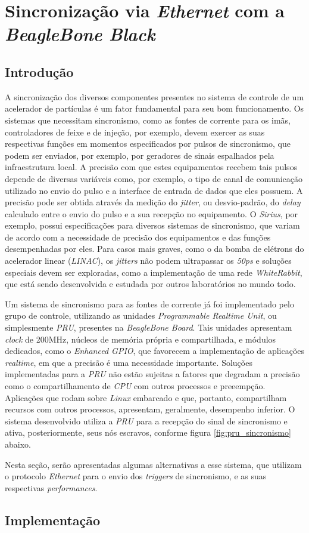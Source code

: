 \section {Sincronização via \textit{Ethernet} com a \textit{BeagleBone Black}}

\subsection {Introdução}

A sincronização dos diversos componentes presentes no sistema de controle de um
acelerador de partículas é um fator fundamental para seu bom funcionamento. Os
sistemas que necessitam sincronismo, como as fontes de corrente para os imãs,
controladores de feixe e de injeção, por exemplo, devem exercer as suas
respectivas funções em momentos especificados por pulsos de sincronismo, que
podem ser enviados, por exemplo, por geradores de sinais espalhados pela
infraestrutura local. A precisão com que estes equipamentos recebem tais pulsos
depende de diversas variáveis como, por exemplo, o tipo de canal de comunicação
utilizado no envio do pulso e a interface de entrada de dados que eles possuem.
A precisão pode ser obtida através da medição do \textit{jitter}, ou
desvio-padrão, do \textit{delay} calculado entre o envio do pulso e a sua
recepção no equipamento.
O \textit{Sirius}, por exemplo, possui especificações para diversos sistemas de
sincronismo, que variam de acordo com a necessidade de precisão dos equipamentos
e das funções desempenhadas por eles. Para casos mais graves, como o da bomba de
elétrons do acelerador linear (\textit{LINAC}), os \textit{jitters} não podem
ultrapassar os \textit{50ps} e soluções especiais devem ser exploradas, como a
implementação de uma rede \textit{WhiteRabbit}, que está sendo
desenvolvida e estudada por outros laboratórios no mundo todo.

\vspace{12pt}

Um sistema de sincronismo para as fontes de corrente já
foi implementado pelo grupo de controle, utilizando as unidades
\textit{Programmable Realtime Unit}, ou simplesmente \textit{PRU}, presentes na
\textit{BeagleBone Board}. Tais unidades apresentam \textit{clock} de 200MHz,
núcleos de memória própria e compartilhada, e módulos dedicados, como o
\textit{Enhanced GPIO}, que favorecem a implementação de aplicações
\textit{realtime}, em que a precisão é uma necessidade importante. Soluções
implementadas para a \textit{PRU} não estão sujeitas a fatores que degradam a
precisão como o compartilhamento de \textit{CPU} com outros
processos e preeempção. Aplicações que rodam sobre \textit{Linux} embarcado e
que, portanto, compartilham recursos com outros processos, apresentam,
geralmente, desempenho inferior. O sistema desenvolvido utiliza a \textit{PRU}
para a recepção do sinal de sincronismo e ativa, posteriormente, seus nós
escravos, conforme figura \ref{fig:pru_sincronismo} abaixo.

\vspace{12pt} 

Nesta seção, serão apresentadas algumas alternativas a esse sistema, que
utilizam o protocolo \textit{Ethernet} para o envio dos \textit{triggers} de
sincronismo, e as suas respectivas \textit{performances}.

\subsection {Implementação}

